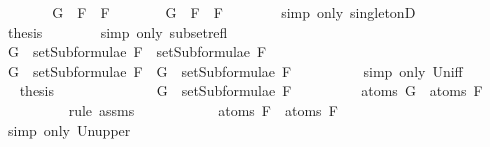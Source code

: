 \begin{isabellebody}
\ \isanewline
\ \ \ \ \isamarkupfalse%
\ {\isachardoublequoteopen}G\ {\isasymin}\ {\isacharbraceleft}F{}\ \isactrlbold {\isasymor}\ F{}{\isacharbraceright}{\isachardoublequoteclose}\isanewline
\ \ \ \ \isamarkupfalse%
\ \isamarkupfalse%
\ {\isachardoublequoteopen}G\ {\isacharequal}\ F{}\ \isactrlbold {\isasymor}\ F{}{\isachardoublequoteclose}\isanewline
\ \ \ \ \ \ \isamarkupfalse%
\ {\isacharparenleft}simp\ only{\isacharcolon}\ singletonD{\isacharparenright}\isanewline
\ \ \ \ \isamarkupfalse%
\ \isamarkupfalse%
\ {\isacharquery}thesis\isanewline
\ \ \ \ \ \ \isamarkupfalse%
\ {\isacharparenleft}simp\ only{\isacharcolon}\ subset{\isacharunderscore}refl{\isacharparenright}\isanewline
\ \ \isamarkupfalse%
\isanewline
\ \ \ \ \isamarkupfalse%
\ {\isachardoublequoteopen}G\ {\isasymin}\ setSubformulae\ F{}\ {\isasymunion}\ setSubformulae\ F{}{\isachardoublequoteclose}\isanewline
\ \ \ \ \isamarkupfalse%
\ \isamarkupfalse%
\ {\isachardoublequoteopen}G\ {\isasymin}\ setSubformulae\ F{}\ {\isasymor}\ G\ {\isasymin}\ setSubformulae\ F{}{\isachardoublequoteclose}\ \ \isanewline
\ \ \ \ \ \ \isamarkupfalse%
\ {\isacharparenleft}simp\ only{\isacharcolon}\ Un{\isacharunderscore}iff{\isacharparenright}\isanewline
\ \ \ \ \isamarkupfalse%
\ \isamarkupfalse%
\ {\isacharquery}thesis\isanewline
\ \ \ \ \isamarkupfalse%
\ \isanewline
\ \ \ \ \ \ \isamarkupfalse%
\ {\isachardoublequoteopen}G\ {\isasymin}\ setSubformulae\ F{}{\isachardoublequoteclose}\isanewline
\ \ \ \ \ \ \isamarkupfalse%
\ \isamarkupfalse%
\ {\isachardoublequoteopen}atoms\ G\ {\isasymsubseteq}\ atoms\ F{}{\isachardoublequoteclose}\isanewline
\ \ \ \ \ \ \ \ \isamarkupfalse%
\ {\isacharparenleft}rule\ assms{\isacharparenleft}{}{\isacharparenright}{\isacharparenright}\isanewline
\ \ \ \ \ \ \isamarkupfalse%
\ \isamarkupfalse%
\ {\isachardoublequoteopen}{\isasymdots}\ {\isasymsubseteq}\ atoms\ F{}\ {\isasymunion}\ atoms\ F{}{\isachardoublequoteclose}\isanewline
\ \ \ \ \ \ \ \ \isamarkupfalse%
\ {\isacharparenleft}simp\ only{\isacharcolon}\ Un{\isacharunderscore}upper{}{\isacharparenright}\isanewline

\end{isabellebody}
